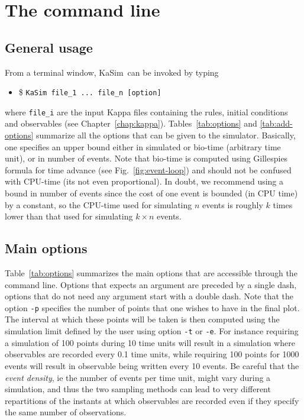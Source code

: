 \documentclass[11pt]{book}
\def\KaSim{\textsf{KaSim}}
\def\ttt#1{\texttt{#1}}
\def\ie{ie }
\def\ITE#1{\begin{itemize}#1\end{itemize}}
\begin{document}
\chapter{The command line}\label{chap:cl}

\section{General usage}
From a terminal window, \KaSim~can be invoked by typing 
\ITE{
\item[\$] \ttt{KaSim file\_1 ... file\_n [option] }
}
where \ttt{file\_i} are the input Kappa files containing the rules, initial conditions and observables (see Chapter~\ref{chap:kappa}). Tables~\ref{tab:options} and \ref{tab:add-options} summarize all the options that can be given to the simulator. Basically, one specifies an upper bound either in simulated or bio-time (arbitrary time unit), or in number of events. Note that bio-time is computed using Gillespie{\textquotesingle}s formula for time advance (see Fig.~\ref{fig:event-loop}) and should not be confused with CPU-time (it{\textquotesingle}s not even proportional). In doubt, we recommend using a bound in number of events since the cost of one event is bounded (in CPU time) by a constant, so the CPU-time used for simulating $n$ events is roughly $k$ times lower than that used for simulating $k\times n$ events.

\section{Main options}

Table~\ref{tab:options} summarizes the main options that are accessible through the command line. Options that expects an argument are preceded by a single dash, options that do not need any argument start with a double dash. Note that the option \ttt{-p} specifies the number of points that one wishes to have in the final plot. The interval at which these points will be taken is then computed using the simulation limit defined by the user using option \ttt{-t} or \ttt{-e}. For instance requiring a simulation of 100 points during 10 time units will result in a simulation where observables are recorded every 0.1 time units, while requiring 100 points for 1000 events will result in observable being written every 10 events. Be careful that the \emph{event density}, \ie the number of events per time unit, might vary during a simulation, and thus the two sampling methods can lead to very different repartitions of the instants at which observables are recorded even if they specify the same number of observations. 
\end{document}
